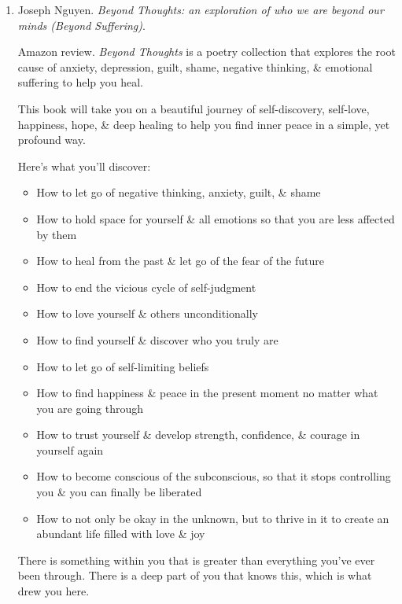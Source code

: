 \documentclass{article}
\begin{document}
\begin{enumerate}
\begin{itemize}
	\end{itemize}
	{\sf About the Author.} {\sc Joseph Nguyen} is a spiritual thought leader who has a mission of helping others realize their divine purpose, unlock the infinite potential of their own mind, \& live an abundant life free from psychological suffering. He spends most of his time writing, coaching, teaching, speaking, \& sharing timeless wisdom to help people discover their own divinity from within \& how they are the answer they've been looking for their entire lives.
	\item {\sc Joseph Nguyen}. {\it Beyond Thoughts: an exploration of who we are beyond our minds (Beyond Suffering)}. {}
	
	{\sf Amazon review.} {\it Beyond Thoughts} is a poetry collection that explores the root cause of anxiety, depression, guilt, shame, negative thinking, \& emotional suffering to help you heal.
	
	This book will take you on a beautiful journey of self-discovery, self-love, happiness, hope, \& deep healing to help you find inner peace in a simple, yet profound way.
	
	Here's what you'll discover:
	\begin{itemize}
		\item How to let go of negative thinking, anxiety, guilt, \& shame
		\item How to hold space for yourself \& all emotions so that you are less affected by them
		\item How to heal from the past \& let go of the fear of the future
		\item How to end the vicious cycle of self-judgment
		\item How to love yourself \& others unconditionally
		\item How to find yourself \& discover who you truly are
		\item How to let go of self-limiting beliefs
		\item How to find happiness \& peace in the present moment no matter what you are going through
		\item How to trust yourself \& develop strength, confidence, \& courage in yourself again
		\item How to become conscious of the subconscious, so that it stops controlling you \& you can finally be liberated
		\item How to not only be okay in the unknown, but to thrive in it to create an abundant life filled with love \& joy
	\end{itemize}
	There is something within you that is greater than everything you've ever been through. There is a deep part of you that knows this, which is what drew you here.
	

\end{enumerate}
\end{document}
